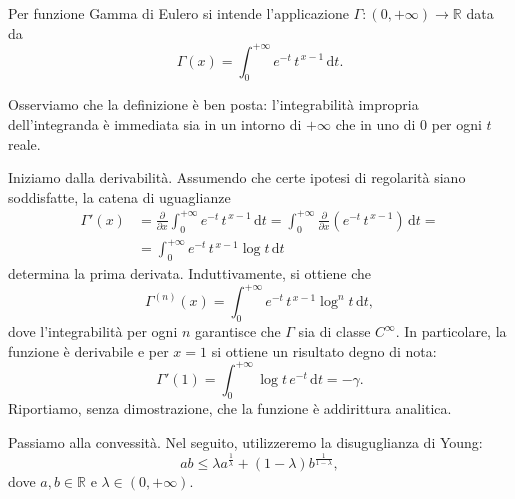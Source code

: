 
\begin{Def} 
	Per funzione Gamma di Eulero si intende l'applicazione $\Gamma:(0,+\infty)\to\mathbb{R}$ data da
	\[
		\Gamma(x)=\int_{0}^{+\infty}e^{-t}\,t^{\,x-1}\,\mathrm{d}t.
	\]
\end{Def}
Osserviamo che la definizione è ben posta: l'integrabilità impropria dell'integranda è immediata sia in un intorno di $+\infty$ che in uno di $0$ per ogni $t$ reale.

Iniziamo dalla derivabilità. Assumendo che certe ipotesi di regolarità siano soddisfatte, la catena di uguaglianze
\[
\begin{split}
	\Gamma'(x) &= \frac{\partial}{\partial x} \int_{0}^{+\infty} e^{-t}\,t^{\,x-1} \,\mathrm{d}t = \int_{0}^{+\infty} \frac{\partial}{\partial x} \left(e^{-t}\,t^{\,x-1}\right) \,\mathrm{d}t = \\ &= \int_{0}^{+\infty} e^{-t}\,t^{\,x-1} \log t \,\mathrm{d}t
\end{split}
\]
determina la prima derivata. Induttivamente, si ottiene che
\[
	\Gamma^{(n)}(x) = \int_{0}^{+\infty} e^{-t}\,t^{\,x-1} \log^n t \,\mathrm{d}t,
\]
dove l'integrabilità per ogni $n$ garantisce che $\Gamma$ sia di classe $C^{\infty}$. In particolare, la funzione è derivabile e per $x=1$ si ottiene un risultato degno di nota:
\[
	\Gamma'(1)= \int_{0}^{+\infty} \log t \, e^{-t} \,\mathrm{d}t = -\gamma.
\]
Riportiamo, senza dimostrazione, che la funzione è addirittura analitica. 


Passiamo alla convessità. Nel seguito, utilizzeremo la disuguglianza di Young:
\begin{equation}
	\label{young_ineq}
	ab \leq \lambda a^\frac{1}{\lambda} + (1-\lambda) b^\frac{1}{1-\lambda},	
\end{equation}
dove $a,b \in \mathbb{R}$ e $\lambda\in\left(0,+\infty\right)$. 

